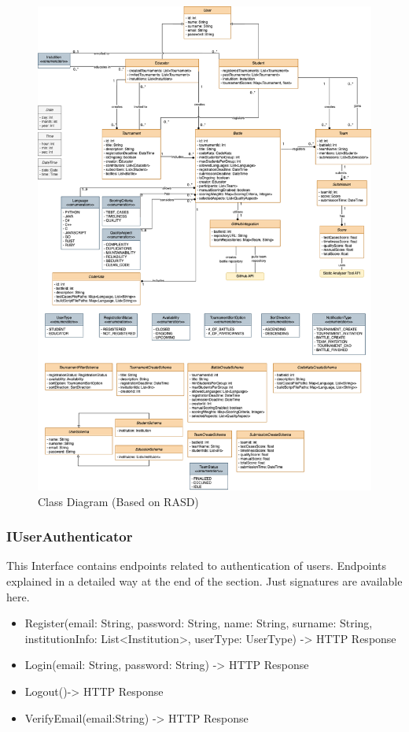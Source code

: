 \begin{figure}[H]
    \centering
    \includegraphics[width=\linewidth]{Images/DD-Class Diagram.drawio.png}
    \caption{Class Diagram (Based on RASD)}
\end{figure}

\subsubsection{IUserAuthenticator}
This Interface contains endpoints related to authentication of users. Endpoints explained in a detailed way at the end of the section. Just signatures are available here.
\begin{itemize}
\item Register(email: String, password: String, name: String, surname: String, institutionInfo: List<Institution>, userType: UserType) -> HTTP Response
\item Login(email: String, password: String) -> HTTP Response
\item Logout()-> HTTP Response
\item VerifyEmail(email:String) -> HTTP Response
\end{itemize}

